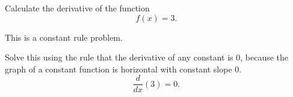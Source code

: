 \documentclass{ximera}
\author{Emma Smith Zbarsky}
\begin{document}
\begin{exercise}

Calculate the derivative of the function \[f(x) = 3.\]


\begin{hint}
This is a constant rule problem.
\end{hint}


\begin{hint}
Solve this using the rule that the derivative of any constant is 0,
because the graph of a constant function is horizontal with constant
slope 0. \[\frac{d}{dx}(3) = \boxed{0}.\]
\end{hint}


\begin{multipleChoice}
\end{multipleChoice}

\end{exercise}
\end{document}
